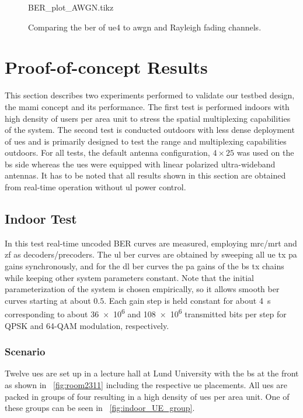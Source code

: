 \documentclass[journal]{IEEEtran}
\begin{document}
\begin{figure}[!t]
	\centering
	\def\filename{UL_all_users_qpsk_with_awgn_user_4.dat}
	  {BER_plot_AWGN.tikz}%
	\caption{Comparing the \gls{ber} of \gls{ue}4 to \gls{awgn} and Rayleigh fading channels.}
	\label{fig:BER_AWGN}
\end{figure} 

\section{Proof-of-concept Results}
\label{sec:Proof_of_Concept_and_Results}
This section describes two experiments performed to validate our testbed design, the \gls{mami} concept and its performance. 
The first test is performed indoors with high density of users per area unit to stress the spatial multiplexing capabilities of the system. 
The second test is conducted outdoors with less dense deployment of \glspl{ue} and is primarily designed to test the range and multiplexing capabilities outdoors.
For all tests, the default antenna configuration, \ie $4\times 25$ was used on the \gls{bs} side whereas the \glspl{ue} were equipped with linear polarized ultra-wideband antennas.
It has to be noted that all results shown in this section are obtained from real-time operation without \gls{ul} power control.

\subsection{Indoor Test}
In this test real-time uncoded BER curves are measured, employing \gls{mrc}/\gls{mrt} and \gls{zf} as decoders/precoders.
%
The \gls{ul} \gls{ber} curves are obtained by sweeping all \gls{ue} \gls{tx} \gls{pa} gains synchronously, and for the \gls{dl} \gls{ber} curves the \gls{pa} gains of the \gls{bs} \gls{tx} chains while keeping other system parameters constant.
Note that the initial parameterization of the system is chosen empirically, so it allows smooth \gls{ber} curves starting at about $0.5$. 
%
Each gain step is held constant for about \SI{4}{\second} corresponding to about \num{36e6} and \num{108e6} transmitted bits per step for QPSK and 64-QAM modulation, respectively.
%
%
%
%

\subsubsection{Scenario}
Twelve \glspl{ue} are set up in a lecture hall at Lund University with the \gls{bs} at the front as shown in \figurename~\ref{fig:room2311} including the respective \gls{ue} placements.
All \glspl{ue} are packed in groups of four resulting in a high density of \glspl{ue} per area unit.
One of these groups can be seen in \figurename~\ref{fig:indoor_UE_group}.
\end{document}
